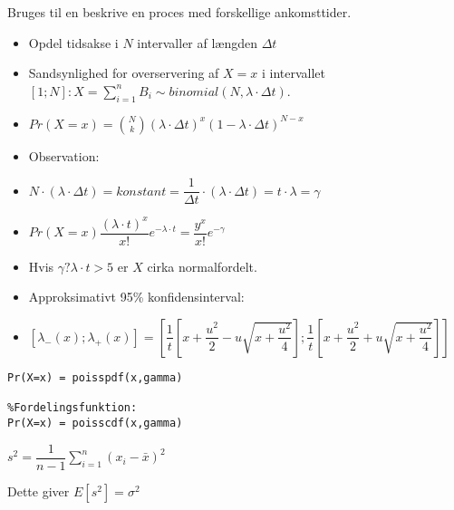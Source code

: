\documentclass[Main]{subfiles}
\begin{document}
\begin{theo}[Poissonfedeling]
Bruges til en beskrive en proces med forskellige ankomsttider.
\begin{itemize}
	\item Opdel tidsakse i $N$ intervaller af længden $\Delta t$
	
	\item Sandsynlighed for overservering af $X = x$ i intervallet $[1;N]: X = \sum_{i=1}^n B_i \sim binomial(N, \lambda \cdot \Delta t)$.
	
	\item[] $Pr(X=x) = \binom{N}{k}(\lambda \cdot \Delta t)^x(1-\lambda \cdot \Delta t)^{N-x}$
	
	\item Observation:
	
	\item[] $N \cdot (\lambda \cdot \Delta t) = konstant = \dfrac{1}{\Delta t} \cdot (\lambda \cdot \Delta t) = t \cdot \lambda = \gamma$
	
	\item[] $Pr(X=x) \dfrac{(\lambda \cdot t)^x}{x!} e^{-\lambda \cdot t} = \dfrac{y^x}{x!}e^{-\gamma} $

	\item Hvis $\gamma ? \lambda \cdot t > 5$ er $X$ cirka normalfordelt.

	\item Approksimativt 95\% konfidensinterval:
	\item[]$[\lambda_-(x);\lambda_+(x)] = \left[\dfrac{1}{t}\left[x+\dfrac{u^2}{2}-u \sqrt{x+\dfrac{u^2}{4}}\right] ; \dfrac{1}{t}\left[x+\dfrac{u^2}{2}+u \sqrt{x+\dfrac{u^2}{4}}\right] \right]$
\end{itemize}
\begin{lstlisting}[style=Code-Matlab]
%TEthedsfunktion:
Pr(X=x) = poisspdf(x,gamma)

%Fordelingsfunktion:
Pr(X=x) = poisscdf(x,gamma)
\end{lstlisting}
\end{theo}

\begin{theo}
$s^2 = \dfrac{1}{n-1} \sum_{i=1}^n (x_i - \bar{x})^2$
\end{theo}
Dette giver $E[s^2] = \sigma^2$
\end{document}
